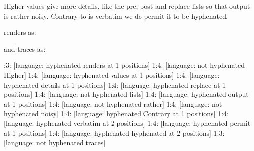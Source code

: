 
\startbuffer
Higher values give more details, like the pre, post and replace lists so that
output is rather noisy. Contrary to \type {\tracinghyphenation} is verbatim we do
permit it \type {\tracinghyphenation} to be hyphenated.
\stopbuffer

\typebuffer

renders as:

\getbuffer

and traces as:

:3: [language: hyphenated renders at 1 positions]
1:4: [language: not hyphenated Higher]
1:4: [language: hyphenated values at 1 positions]
1:4: [language: hyphenated details at 1 positions]
1:4: [language: hyphenated replace at 1 positions]
1:4: [language: not hyphenated lists]
1:4: [language: hyphenated output at 1 positions]
1:4: [language: not hyphenated rather]
1:4: [language: not hyphenated noisy]
1:4: [language: hyphenated Contrary at 1 positions]
1:4: [language: hyphenated verbatim at 2 positions]
1:4: [language: hyphenated permit at 1 positions]
1:4: [language: hyphenated hyphenated at 2 positions]
1:3: [language: not hyphenated traces]
\stoptyping

\stopsection

\stopdocument


